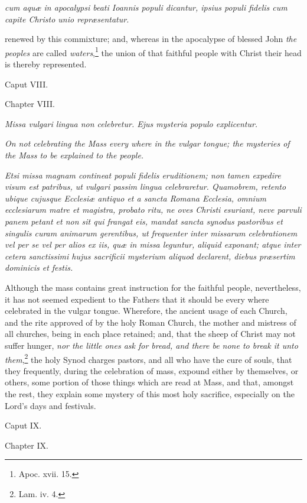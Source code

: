 \emph{cum aquæ in apocalypsi beati Ioannis populi dicantur, ipsius populi fidelis cum capite Christo unio repræsentatur.}

renewed by this commixture; and, whereas in the apocalypse of blessed John \emph{the peoples} are called \emph{waters},\footnote{\par   Apoc. xvii. 15.} the union of that faithful people with Christ their head is thereby represented.

Caput VIII.

Chapter VIII.

\emph{Missa vulgari lingua non celebretur. Ejus mysteria populo explicentur.}

\emph{On not celebrating the Mass every where in the vulgar tongue; the mysteries of the Mass to be explained to the people.}

\emph{Etsi missa magnam contineat populi fidelis eruditionem; non tamen expedire visum est patribus, ut vulgari passim lingua celebraretur. Quamobrem, retento ubique cujusque Ecclesiæ antiquo et a sancta Romana Ecclesia, omnium ecclesiarum matre et magistra, probato ritu, ne oves Christi esuriant, neve parvuli panem petant et non sit qui frangat eis, mandat sancta synodus pastoribus et singulis curam animarum gerentibus, ut frequenter inter missarum celebrationem vel per se vel per alios ex iis, quæ in missa leguntur, aliquid exponant; atque inter cetera sanctissimi hujus sacrificii mysterium aliquod declarent, diebus præsertim dominicis et festis.}

Although the mass contains great instruction for the faithful people, nevertheless, it has not seemed expedient to the Fathers that it should be every where celebrated in the vulgar tongue. Wherefore, the ancient usage of each Church, and the rite approved of by the holy Roman Church, the mother and mistress of all churches, being in each place retained; and, that the sheep of Christ may not suffer hunger, \emph{nor the little ones ask for bread, and there be none to break it unto them},\footnote{\par   Lam. iv. 4.} the holy Synod charges pastors, and all who have the cure of souls, that they frequently, during the celebration of mass, expound either by themselves, or others, some portion of those things which are read at Mass, and that, amongst the rest, they explain some mystery of this most holy sacrifice, especially on the Lord's days and festivals.

Caput IX.

Chapter IX.

